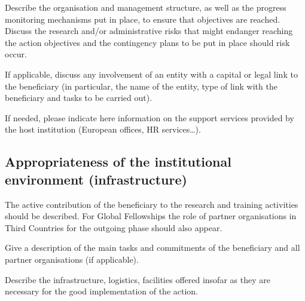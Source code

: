 Describe the organisation and management structure, as well as the
progress monitoring mechanisms put in place, to ensure that
objectives are reached. Discuss the research and/or administrative
risks that might endanger reaching the action objectives and the
contingency plans to be put in place should risk occur.

If applicable, discuss any involvement of an entity with a capital
or legal link to the beneficiary (in particular, the name of the
entity, type of link with the beneficiary and tasks to be carried
out). 

If needed, please indicate here information on the support
services provided by the host institution (European offices, HR
services\dots).

\subsection{Appropriateness of the institutional environment
(infrastructure)}
\label{sec:implementation_infrastructure}

The active contribution of the beneficiary to the research and
training activities should be described. For Global Fellowships
the role of partner organisations in Third Countries for the
outgoing phase should also appear.


Give a description of the main tasks and commitments of the
beneficiary and all partner organisations (if applicable).

Describe the infrastructure, logistics, facilities offered insofar
as they are necessary for the good implementation of the action.

\markEndPageLimit
